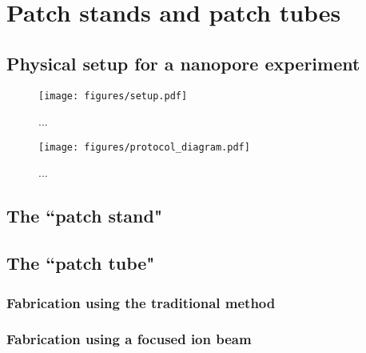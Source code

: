 \chapter{Patch stands and patch tubes}
\label{patch_stands_tubes}

\section{Physical setup for a nanopore experiment}

\begin{figure}[h]
\begin{centering}
\texttt{[image: figures/setup.pdf]}
\caption[Diagram of physical experimental setup]{...}
\label{fig:physical_setup}
\end{centering}
\end{figure}

\begin{figure}[h]
\begin{centering}
\texttt{[image: figures/protocol\_diagram.pdf]}
\caption[Schematic of patch stand]{...}
\label{fig:helicase_data}
\end{centering}
\end{figure}

\section{The ``patch stand"}

\section{The ``patch tube"}

\subsection{Fabrication using the traditional method}

\subsection{Fabrication using a focused ion beam}